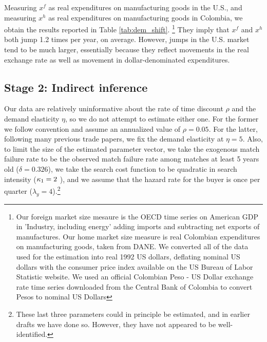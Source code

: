 \documentclass[12pt]{article}
\begin{document}
Measuring $x^{f}$ as real expenditures on manufacturing goods in the U.S.,
and measuring $x^{h}$ as real expenditures on manufacturing goods in
Colombia, we obtain the results reported in Table \ref{tab:dem_shift}.%
\footnote{%
Our foreign market size mesaure is the OECD time series on American GDP in
'Industry, including energy' adding imports and subtracting net exports of
manufactures. Our home market size measure is real Colombian expenditures on
manufacturing goods, taken from DANE. We converted all of the data used for
the estimation into real 1992 US dollars, deflating nominal US dollars with
the consumer price index available on the US Bureau of Labor Statistic
website. We used an official Colombian Peso - US Dollar exchange rate time
series downloaded from the Central Bank of Colombia to convert Pesos to
nominal US Dollars} They imply that $x^{f}$ and $x^{h}$ both jump 1.2 times
per year, on average. However, jumps in the U.S. market tend to be much
larger, essentially because they reflect movements in the real exchange rate
as well as movement in dollar-denominated expenditures.

\label{sec:indirect_inference}

\subsection{Stage 2: Indirect inference}

\FloatBarrier

Our data are relatively uninformative about the rate of time discount $\rho $
and the demand elasticity $\eta $, so we do not attempt to estimate either
one$.$ For the former we follow convention and assume an annualized value of $\rho =0.05 $. For the
latter, following many previous trade papers, we fix the demand elasticity
at $\eta =5.$ Also, to limit the size of the estimated parameter vector, we
take the exogenous match failure rate to be the observed match failure rate
among matches at least 5 years old ($\delta =0.326$), we take the search
cost function to be quadratic in search intensity (${\small \kappa _{1}}=2$%
), and we assume that the hazard rate for the buyer is once per quarter ($%
\lambda _{y}=4$).\footnote{%
These last three parameters could in principle be estimated, and in earlier
drafts we have done so. However, they have not appeared to be
well-identified.}
\end{document}
